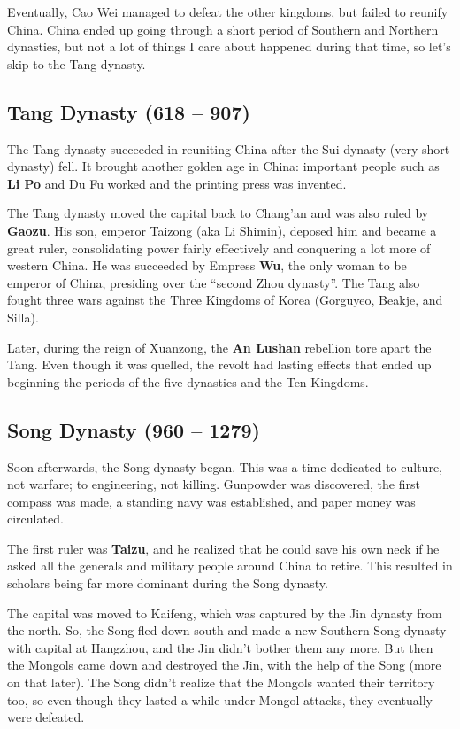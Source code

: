 Eventually, Cao Wei managed to defeat the other kingdoms, but failed to reunify China.
China ended up going through a short period of Southern and Northern dynasties,
but not a lot of things I care about happened during that time, so let's skip to the Tang dynasty.

\subsection*{Tang Dynasty (618 -- 907)}

The Tang dynasty succeeded in reuniting China after the Sui dynasty (very short dynasty) fell.
It brought another golden age in China:
important people such as \textbf{Li Po} and Du Fu worked and the printing press was invented.

The Tang dynasty moved the capital back to Chang'an and was also ruled by \textbf{Gaozu}.
His son, emperor Taizong (aka Li Shimin), deposed him and became a great ruler,
consolidating power fairly effectively and conquering a lot more of western China.
He was succeeded by Empress \textbf{Wu}, the only woman to be emperor of China,
presiding over the ``second Zhou dynasty''.
The Tang also fought three wars against the Three Kingdoms of Korea (Gorguyeo, Beakje, and Silla).

Later, during the reign of Xuanzong, the \textbf{An Lushan} rebellion tore apart the Tang.
Even though it was quelled, the revolt had lasting effects that ended up beginning the
periods of the five dynasties and the Ten Kingdoms.

\subsection*{Song Dynasty (960 -- 1279)}

Soon afterwards, the Song dynasty began.
This was a time dedicated to culture, not warfare; to engineering, not killing.
Gunpowder was discovered, the first compass was made,
a standing navy was established, and paper money was circulated.

The first ruler was \textbf{Taizu}, and he realized that he could save his own neck if he
asked all the generals and military people around China to retire.
This resulted in scholars being far more dominant during the Song dynasty.

The capital was moved to Kaifeng, which was captured by the Jin dynasty from the north.
So, the Song fled down south and made a new Southern Song dynasty with capital at Hangzhou,
and the Jin didn't bother them any more.
But then the Mongols came down and destroyed the Jin, with the help of the Song (more on that later).
The Song didn't realize that the Mongols wanted their territory too,
so even though they lasted a while under Mongol attacks, they eventually were defeated.

